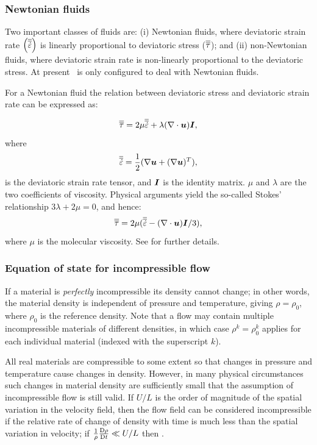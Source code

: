 \subsubsection{Newtonian fluids}

Two important classes of fluids are: (i) Newtonian fluids, where deviatoric strain rate $\left(\overline{\overline{\dot{\varepsilon}}}\right)$ is linearly proportional to deviatoric stress ($\overline{\overline{\tau}}$); and (ii) non-Newtonian fluids, where deviatoric strain rate is non-linearly proportional to the deviatoric stress. At present \fluidity\ is only configured to deal with Newtonian fluids.

For a Newtonian fluid the relation between deviatoric stress and deviatoric strain rate can be expressed as:

\begin{equation}
\overline{\overline{\tau}} = 2\mu \overline{\overline{\dot{\varepsilon}}} + \lambda(\nabla\cdot{\mbox{\boldmath$u$}}){\mbox{\boldmath$I$}},
\end{equation}
where
\begin{equation}
 \overline{\overline{\dot{\varepsilon}}} = \frac{1}{2}(\nabla{\mbox{\boldmath$u$}} + (\nabla{\mbox{\boldmath$u$}})^T),
\end{equation}
is the
deviatoric strain rate tensor, and ${\mbox{\boldmath$I$}}$ is the identity matrix. $\mu$ and
$\lambda$ are the two coefficients of viscosity. Physical arguments
yield the so-called Stokes' relationship $3\lambda+2\mu=0$, and
hence:
\begin{equation}
\overline{\overline{\tau}} = 2\mu(\overline{\overline{\dot{\varepsilon}}} - (\nabla\cdot{\mbox{\boldmath$u$}}){\mbox{\boldmath$I$}}/3),
\end{equation}
where $\mu$ is the molecular viscosity. See \cite{batchelor1967} for further
details.

\subsubsection{Equation of state for incompressible flow}
\label{sec:IncompressibleFlow}

If a material is \emph{perfectly} incompressible its density cannot change;
in other words, the material density is independent of pressure and
temperature, giving $\rho = \rho_0$, where $\rho_0$ is the reference
density. Note that a flow may contain multiple incompressible materials of
different densities, in which case $\rho^k=\rho_0^k$ applies for each
individual material (indexed with the superscript $k$).

All real materials are compressible to some extent so that changes in
pressure and temperature cause changes in density.  However, in many
physical circumstances such changes in material density are sufficiently
small that the assumption of incompressible flow is still valid. If $U/L$ is
the order of magnitude of the spatial variation in the velocity field, then
the flow field can be considered incompressible if the relative rate of
change of density with time is much less than the spatial variation in
velocity; \ie if $\frac{1}{\rho}\frac{\mathrm{D}\rho}{\mathrm{D} t}\ll U/L$ then \cite[][p.167]{batchelor1967}.

